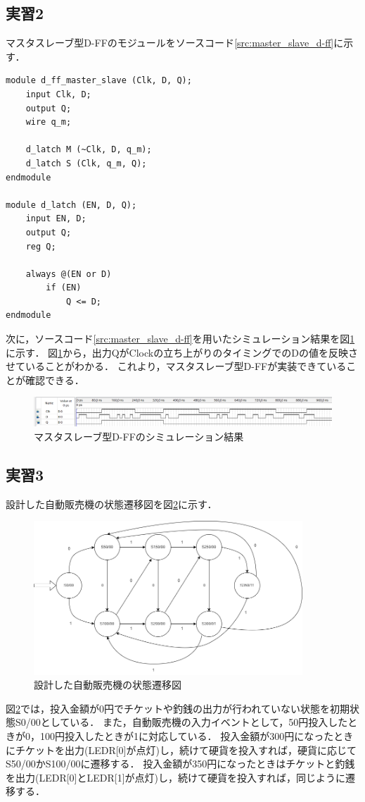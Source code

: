 \documentclass{jlreq}
\numberwithin{equation}{section}
\begin{document}
\subsection{実習2}
マスタスレーブ型D-FFのモジュールをソースコード\ref{src:master_slave_d-ff}に示す．
\begin{lstlisting}[caption=マスタスレーブ型D-FFのモジュール, label=src:master_slave_d-ff]
module d_ff_master_slave (Clk, D, Q);
	input Clk, D;
	output Q;
	wire q_m;
	
	d_latch M (~Clk, D, q_m);
	d_latch S (Clk, q_m, Q);
endmodule

module d_latch (EN, D, Q);
	input EN, D;
	output Q;
	reg Q;
	
	always @(EN or D)
		if (EN)
			Q <= D;	
endmodule
\end{lstlisting}

次に，ソースコード\ref{src:master_slave_d-ff}を用いたシミュレーション結果を図\ref{fig:result_master_slave_d-ff}に示す．
図\ref{fig:result_master_slave_d-ff}から，出力QがClockの立ち上がりのタイミングでのDの値を反映させていることがわかる．
これより，マスタスレーブ型D-FFが実装できていることが確認できる．
\begin{figure}
	\centering
	\includegraphics[width=\textwidth]{assets/dff_result.png}
	\caption{マスタスレーブ型D-FFのシミュレーション結果}
	\label{fig:result_master_slave_d-ff}
\end{figure}

\subsection{実習3}
設計した自動販売機の状態遷移図を図\ref{fig:state_transition_diagram}に示す．
\begin{figure}[H]
	\centering
	\includegraphics[width=0.9\textwidth]{assets/my_fsm.png}
	\caption{設計した自動販売機の状態遷移図}
	\label{fig:state_transition_diagram}
\end{figure}
図\ref{fig:state_transition_diagram}では，投入金額が0円でチケットや釣銭の出力が行われていない状態を初期状態S0/00としている．
また，自動販売機の入力イベントとして，50円投入したときが0，100円投入したときが1に対応している．
投入金額が300円になったときにチケットを出力(LEDR[0]が点灯)し，続けて硬貨を投入すれば，硬貨に応じてS50/00かS100/00に遷移する．
投入金額が350円になったときはチケットと釣銭を出力(LEDR[0]とLEDR[1]が点灯)し，続けて硬貨を投入すれば，同じように遷移する．
\end{document}
